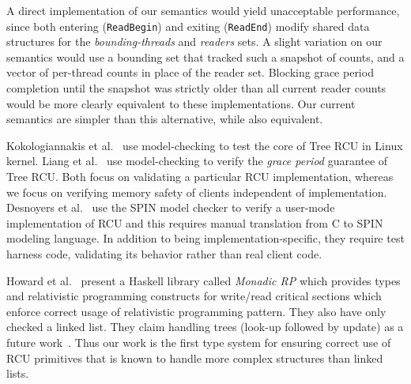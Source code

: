  A direct implementation of our semantics would yield unacceptable performance, since both entering (\lstinline|ReadBegin|) and exiting (\lstinline|ReadEnd|) modify shared data structures for the \textit{bounding-threads} and \textit{readers} sets. A slight variation on our semantics would use a bounding set  that tracked such a snapshot of counts, and a vector of per-thread counts in place of the reader set. Blocking grace period completion until the snapshot was strictly older than all current reader counts would be more clearly equivalent to these implementations. Our current semantics are simpler than this alternative, while also equivalent. 

 Kokologiannakis et al.~\cite{Kokologiannakis:2017:SMC:3092282.3092287} use model-checking to test the core of \textsf{Tree RCU} in Linux kernel. Liang et al.~\cite{LiangMKM16} use model-checking to verify the \emph{grace period} guarantee of \textsf{Tree RCU}. Both focus on validating a particular RCU implementation, whereas we focus on verifying memory safety of clients independent of implementation. Desnoyers et al.~\cite{urcu_ieee} use the \textsf{SPIN} model checker to verify a user-mode implementation of RCU and this requires manual translation from C to SPIN modeling language.
In addition to being implementation-specific, they require test harness code, validating its behavior rather than real client code.

Howard et al.~\cite{Howard:2011:RES:2001252.2001267,Cooper2015RelativisticPI} present a \textsf{Haskell} library called \emph{Monadic RP} which provides types and relativistic programming constructs for write/read critical sections which enforce correct usage of relativistic programming pattern. They also have only checked a linked list. They claim  handling trees (look-up followed by update) as a future work~\cite{Howard:2011:RES:2001252.2001267}. Thus our work is the first type system for ensuring correct use of RCU primitives that is known to handle more complex structures than linked lists.
